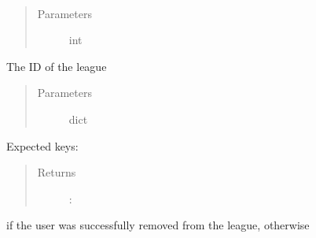 \documentclass[letterpaper,10pt,english]{sphinxmanual}
\begin{document}
\begin{fulllineitems}
\label{\detokenize{tiger_leagues/models/readme:tiger_leagues.models.league_model.process_leave_league_request}}~\begin{quote}\begin{description}
\item[{Parameters}] \leavevmode
{} \textendash{} int

\end{description}\end{quote}

The ID of the league
\begin{quote}\begin{description}
\item[{Parameters}] \leavevmode
{} \textendash{} dict

\end{description}\end{quote}

Expected keys: 
\begin{quote}\begin{description}
\item[{Returns}] \leavevmode
{}:

\end{description}\end{quote}

 if the user was successfully removed from the league,  
otherwise

\end{fulllineitems}

\end{document}
